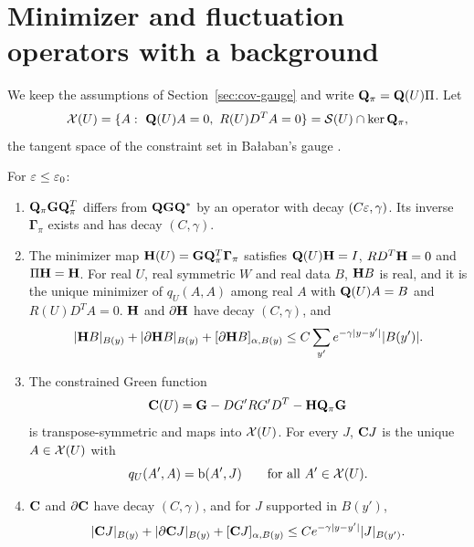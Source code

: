\section{Minimizer and fluctuation operators with a background}\label{sec:cov-min}

We keep the assumptions of Section~\ref{sec:cov-gauge} and write $\mathbf Q_\pi=\mathbf Q(U)\Pi$. Let
\[
\mathcal X(U)=\{A:\ \mathbf Q(U)A=0,\ R(U)D^TA=0\}=\mathcal S(U)\cap\ker\mathbf Q_\pi ,
\]
the tangent space of the constraint set in Ba\l aban's gauge \cite[(100)]{BalVar}.

\begin{theorem}\label{thm:cov-min}
For $\varepsilon\le\varepsilon_0$:
\begin{enumerate}[label=(\alph*)]
\item $\mathbf Q_\pi\mathbf G\mathbf Q_\pi^T$ differs from $\mathbf Q\mathbf G\mathbf Q^*$ by an operator with decay $(C\varepsilon,\gamma)$. Its inverse $\boldsymbol\Gamma_\pi$ exists and has decay $(C,\gamma)$.
\item The minimizer map $\mathbf H(U)=\mathbf G\mathbf Q_\pi^T\boldsymbol\Gamma_\pi$ satisfies $\mathbf Q(U)\mathbf H=I$, $RD^T\mathbf H=0$ and $\Pi\mathbf H=\mathbf H$. For real $U$, real symmetric $W$ and real data $B$, $\mathbf H B$ is real, and it is the unique minimizer of $q_U(A,A)$ among real $A$ with $\mathbf Q(U)A=B$ and $R(U)D^TA=0$. $\mathbf H$ and $\partial\mathbf H$ have decay $(C,\gamma)$, and
\[
|\mathbf H B|_{B(y)}+|\partial\mathbf H B|_{B(y)}+[\partial\mathbf H B]_{\alpha,B(y)}\le C\sum_{y'}e^{-\gamma|y-y'|}|B(y')| .
\]
\item The constrained Green function
\[
\mathbf C(U)=\mathbf G-DG'RG'D^T-\mathbf H\mathbf Q_\pi\mathbf G
\]
is transpose-symmetric and maps into $\mathcal X(U)$. For every $J$, $\mathbf C J$ is the unique $A\in\mathcal X(U)$ with
\[
q_U(A',A)=\mathrm b(A',J)\qquad\text{for all }A'\in\mathcal X(U).
\]
\item $\mathbf C$ and $\partial\mathbf C$ have decay $(C,\gamma)$, and for $J$ supported in $B(y')$,
\[
|\mathbf C J|_{B(y)}+|\partial\mathbf C J|_{B(y)}+[\mathbf C J]_{\alpha,B(y)}\le Ce^{-\gamma|y-y'|}|J|_{B(y')} .
\]
\end{enumerate}
\end{theorem}

